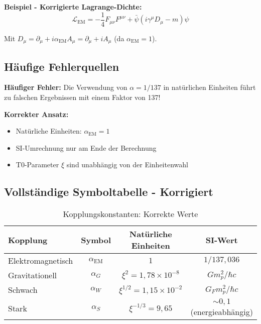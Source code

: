 \documentclass[12pt,a4paper]{report}
\begin{document}
	\textbf{Beispiel - Korrigierte Lagrange-Dichte:}
	\begin{equation}
		\mathcal{L}_{\text{EM}} = -\frac{1}{4}F_{\mu\nu}F^{\mu\nu} + \bar{\psi}(i\gamma^\mu D_\mu - m)\psi
	\end{equation}
	
	Mit $D_\mu = \partial_\mu + i \alpha_{\text{EM}} A_\mu = \partial_\mu + i A_\mu$ (da $\alpha_{\text{EM}} = 1$).
	
	\subsection{Häufige Fehlerquellen}
	\label{subsec:common_errors}
	
	\begin{tcolorbox}[colback=yellow!10!white,colframe=orange!75!black,title=WARNUNG]
		\textbf{Häufiger Fehler:}
		Die Verwendung von $\alpha = 1/137$ in natürlichen Einheiten führt zu falschen Ergebnissen mit einem Faktor von 137!
		
		\textbf{Korrekter Ansatz:}
		\begin{itemize}
			\item Natürliche Einheiten: $\alpha_{\text{EM}} = 1$
			\item SI-Umrechnung nur am Ende der Berechnung
			\item T0-Parameter $\xi$ sind unabhängig von der Einheitenwahl
		\end{itemize}
	\end{tcolorbox}
	
	\subsection{Vollständige Symboltabelle - Korrigiert}
	\label{subsec:corrected_symbol_table}
	
	\begin{table}[h!]
		\centering
		\caption{Kopplungskonstanten: Korrekte Werte}
		\begin{tabular}{|l|c|c|c|}
			\hline
			\textbf{Kopplung} & \textbf{Symbol} & \textbf{Natürliche Einheiten} & \textbf{SI-Wert} \\
			\hline
			Elektromagnetisch & $\alpha_{\text{EM}}$ & $1$ & $1/137,036$ \\
			Gravitationell & $\alpha_G$ & $\xi^2 = 1,78 \times 10^{-8}$ & $G m_p^2/\hbar c$ \\
			Schwach & $\alpha_W$ & $\xi^{1/2} = 1,15 \times 10^{-2}$ & $G_F m_p^2/\hbar c$ \\
			Stark & $\alpha_S$ & $\xi^{-1/3} = 9,65$ & $\sim 0,1$ (energieabhängig) \\
			\hline
		\end{tabular}
	\end{table}
	
\end{document}
